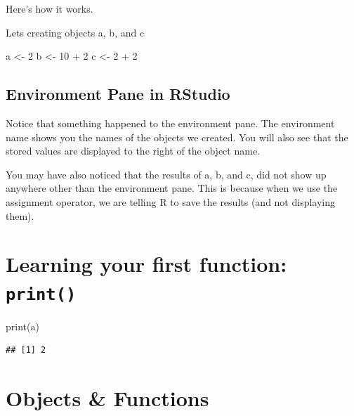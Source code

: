 \documentclass[
]{book}
\newenvironment{Shaded}{\begin{snugshade}}{\end{snugshade}}
\newcommand{\DecValTok}[1]{\textcolor[rgb]{0.00,0.00,0.81}{#1}}
\newcommand{\FunctionTok}[1]{\textcolor[rgb]{0.00,0.00,0.00}{#1}}
\newcommand{\NormalTok}[1]{#1}
\newcommand{\OtherTok}[1]{\textcolor[rgb]{0.56,0.35,0.01}{#1}}
\newcommand{\SpecialCharTok}[1]{\textcolor[rgb]{0.00,0.00,0.00}{#1}}
\begin{document}
Here's how it works.

Lets creating objects a, b, and c

\begin{Shaded}
\begin{Highlighting}[]
\NormalTok{a }\OtherTok{\textless{}{-}} \DecValTok{2}
\NormalTok{b }\OtherTok{\textless{}{-}} \DecValTok{10} \SpecialCharTok{+} \DecValTok{2}
\NormalTok{c }\OtherTok{\textless{}{-}} \DecValTok{2} \SpecialCharTok{+} \DecValTok{2}
\end{Highlighting}
\end{Shaded}

\hypertarget{environment-pane-in-rstudio}{%
\subsection{Environment Pane in RStudio}\label{environment-pane-in-rstudio}}

Notice that something happened to the environment pane. The environment name shows you the names of the objects we created. You will also see that the stored values are displayed to the right of the object name.

You may have also noticed that the results of a, b, and c, did not show up anywhere other than the environment pane. This is because when we use the assignment operator, we are telling R to save the results (and not displaying them).

\hypertarget{learning-your-first-function-print}{%
\section{\texorpdfstring{Learning your first function: \texttt{print()}}{Learning your first function: print()}}\label{learning-your-first-function-print}}

\begin{Shaded}
\begin{Highlighting}[]
\FunctionTok{print}\NormalTok{(a)}
\end{Highlighting}
\end{Shaded}

\begin{verbatim}
## [1] 2
\end{verbatim}

\hypertarget{objects-functions}{%
\section{Objects \& Functions}\label{objects-functions}}
\end{document}
